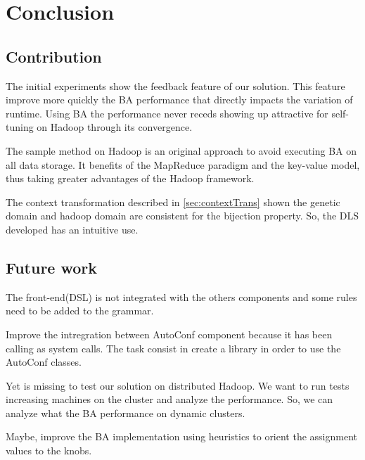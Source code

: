 \chapter{Conclusion} %
\label{cha:conclusion}


\section{Contribution}
The initial experiments show the feedback feature of our solution. This feature
improve more quickly the BA performance that directly impacts the variation of
runtime. Using BA the performance never receds showing up attractive for self-tuning
on Hadoop through its convergence.

The sample method on Hadoop is an original approach to avoid executing BA on all
data storage. It benefits of the MapReduce paradigm and the key-value model, thus
taking greater advantages of the Hadoop framework.

The context transformation described in \ref{sec:contextTrans} shown the genetic
domain and hadoop domain are consistent for the bijection property. So, the DLS
developed has an intuitive use.

\section{Future work}

The front-end(DSL) is not integrated with the others components and some
rules need to be added to the grammar.

Improve the intregration between AutoConf component because it has been
calling as system calls. The task consist in create a library in order to use
the AutoConf classes.

Yet is missing to test our solution on distributed Hadoop. We want to
run tests increasing machines on the cluster and analyze the performance. So,
we can analyze what the BA performance on dynamic clusters.

Maybe, improve the BA implementation using heuristics to orient the
assignment values to the knobs.
